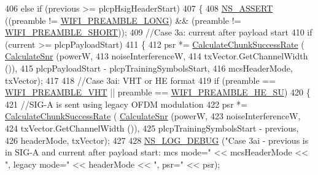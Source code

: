 \begin{DoxyCode}
406       \textcolor{keywordflow}{else} \textcolor{keywordflow}{if} (previous >= plcpHsigHeaderStart)
407         \{
408           \hyperlink{assert_8h_a6dccdb0de9b252f60088ce281c49d052}{NS\_ASSERT} ((preamble != \hyperlink{group__wifi_gga5e94a56cb338a14ffbbb19c6a41251eba12f3d9468d1630bd38bbef20df1e3eda}{WIFI\_PREAMBLE\_LONG}) && (preamble != 
      \hyperlink{group__wifi_gga5e94a56cb338a14ffbbb19c6a41251ebab9a39ca1f62d36c33ac489c4cf59745b}{WIFI\_PREAMBLE\_SHORT}));
409           \textcolor{comment}{//Case 3a: current after payload start}
410           \textcolor{keywordflow}{if} (current >= plcpPayloadStart)
411             \{
412               psr *= \hyperlink{classns3_1_1InterferenceHelper_ab1c34c3f7ecef1e37ec778c0cf0e9cef}{CalculateChunkSuccessRate} (
      \hyperlink{classns3_1_1InterferenceHelper_a8f6192d041874595004c007c5a519b4b}{CalculateSnr} (powerW,
413                                                               noiseInterferenceW,
414                                                               txVector.GetChannelWidth ()),
415                                                 plcpPayloadStart - plcpTrainingSymbolsStart,
416                                                 mcsHeaderMode, txVector);
417 
418               \textcolor{comment}{//Case 3ai: VHT or HE format}
419               \textcolor{keywordflow}{if} (preamble == \hyperlink{group__wifi_gga5e94a56cb338a14ffbbb19c6a41251ebab90b0fe0b17f27e51c0fe16239e7b089}{WIFI\_PREAMBLE\_VHT} || preamble == 
      \hyperlink{group__wifi_gga5e94a56cb338a14ffbbb19c6a41251eba99c3e12c6e91fc9a9bee491d20dab807}{WIFI\_PREAMBLE\_HE\_SU})
420                 \{
421                   \textcolor{comment}{//SIG-A is sent using legacy OFDM modulation}
422                   psr *= \hyperlink{classns3_1_1InterferenceHelper_ab1c34c3f7ecef1e37ec778c0cf0e9cef}{CalculateChunkSuccessRate} (
      \hyperlink{classns3_1_1InterferenceHelper_a8f6192d041874595004c007c5a519b4b}{CalculateSnr} (powerW,
423                                                                   noiseInterferenceW,
424                                                                   txVector.GetChannelWidth ()),
425                                                     plcpTrainingSymbolsStart - previous,
426                                                     headerMode, txVector);
427 
428                   \hyperlink{group__logging_ga413f1886406d49f59a6a0a89b77b4d0a}{NS\_LOG\_DEBUG} (\textcolor{stringliteral}{"Case 3ai - previous is in SIG-A and current after payload
       start: mcs mode="} << mcsHeaderMode << \textcolor{stringliteral}{", legacy mode="} << headerMode << \textcolor{stringliteral}{", psr="} << psr);

\end{DoxyCode}
